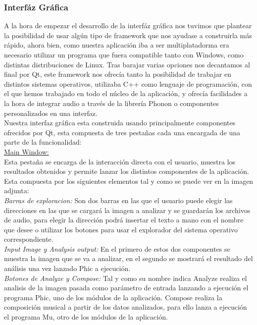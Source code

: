 \subsubsection{Interfáz Gráfica}

A la hora de empezar el desarrollo de la interfáz gráfica nos tuvimos que plantear la posibilidad de usar algún tipo de framework que nos ayudase a construirla más rápido, ahora bien, como nuestra aplicación iba a ser multiplatadorma era necesario utilizar un programa que fuera compatible tanto con Windows, como distintas distribuciones de Linux. Tras barajar varias opciones nos decantamos al final por Qt, este framework nos ofrecía tanto la posibilidad de trabajar en distintos sistemas operativos, utilizaba C++ como lenguaje de programación, con el que hemos trabajado en todo el núcleo de la aplicación, y ofrecía facilidades a la hora de integrar audio a través de la librería Phonon o componentes personalizados en una interfaz.\\
\newline
Nuestra interfaz gráfica esta construida usando principalmente componentes ofrecidos por Qt, esta compuesta de tres pestañas cada una encargada de una parte de la funcionalidad:
\newline
\\\underline{Main Window:}
\\Esta pestaña se encarga de la interacción directa con el usuario, muestra los resultados obtenidos y permite lanzar los distintos componentes de la aplicación. 
\\Esta compuesta por los siguientes elementos tal y como se puede ver en la imagen adjunta:
\newline
\\\textit{Barras de exploracion:} Son dos barras en las que el usuario puede elegir las direcciones en las que se cargará la imagen a analizar y se guardarán los archivos de audio, para elegir la dirección podrá insertar el texto a mano con el nombre que desee o utilizar los botones para usar el explorador del sistema operativo correspondiente.
\\\textit{Input Image y Analysis output:} En el primero de estos dos componentes se muestra la imagen que se va a analizar, en el segundo se mostrará el resultado del análisis una vez lanzado Phic a ejecución.
\\\textit{Botones de Analyze y Compose:} Tal y como su nombre indica Analyze realiza el analisis de la imagen pasada como parámetro de entrada lanzando a ejecución el programa Phic, uno de los módulos de la aplicación. Compose realiza la composición musical a partir de los datos analizados, para ello lanza a ejecución el programa Mu, otro de los módulos de la aplicación.
